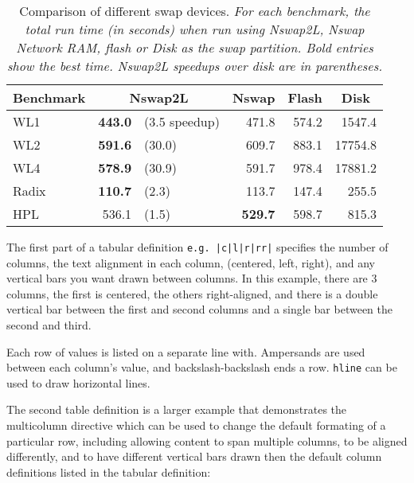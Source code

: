 \documentclass[11pt,twocolumn]{article}
\begin{document}
\begin{table*}
\begin{center}
\begin{tabular}{|l||r l|r|r|r|}
\hline
\multicolumn{1}{|c||}{Benchmark} & \multicolumn{2}{c|}{Nswap2L} &\multicolumn{1}{c|}{Nswap} &\multicolumn{1}{c|}{Flash} & \multicolumn{1}{c|}{Disk} \\
\hline
WL1   & {\bf 443.0} & (3.5 speedup)    & 471.8  & 574.2  & 1547.4 \\
WL2   & {\bf 591.6} &(30.0)            & 609.7  & 883.1  & 17754.8\\
WL4   & {\bf 578.9} &(30.9)            & 591.7  & 978.4  & 17881.2\\
Radix & {\bf 110.7} &(2.3)             & 113.7  & 147.4  & 255.5 \\
HPL   & 536.1 &(1.5)             & {\bf 529.7}  & 598.7  & 815.3 \\
\hline
\end{tabular}

\caption{\label{swapdevresults} Comparison of different swap devices. 
  {\em For each benchmark, the total run time (in seconds) when 
    run using Nswap2L, Nswap Network RAM, flash or Disk as the 
    swap partition. Bold entries show the best time.  Nswap2L speedups 
over disk are in parentheses.} }
\end{center}
\end{table*}

The first part of a tabular definition {\tt e.g. |c|l|r|rr|} 
specifies the number of columns, the text alignment in each column,
(centered, left, right), and any vertical bars you want drawn between 
columns.  In this example, there are 3 columns, the first is 
centered, the others right-aligned, and there is a double 
vertical bar between the first and second columns and a single bar 
between the second and third.

Each row of values is listed on a separate line with.  Ampersands are 
used between each column's value, and backslash-backslash ends a row.   
{\tt hline} can be used to draw horizontal lines.  

The second table definition is a larger example that 
demonstrates the multicolumn directive
which can be used to change the default formating of a particular row,
including allowing content to span multiple columns, to be aligned 
differently, and to have different vertical bars drawn then the 
default column definitions listed in the tabular definition:
\end{document}
